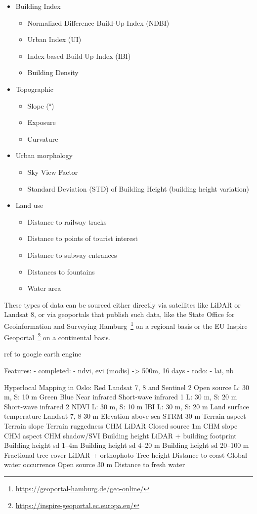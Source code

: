 \begin{itemize}
    \item Building Index
    \begin{itemize}
        \item Normalized Difference Build-Up Index (NDBI)
        \item Urban Index (UI)
        \item Index-based Build-Up Index (IBI)
        \item Building Density
    \end{itemize}
    \item Topographic
    \begin{itemize}
        \item Slope (°)
        \item Exposure
        \item Curvature
    \end{itemize}
    \item Urban morphology
    \begin{itemize}
        \item Sky View Factor
        \item Standard Deviation (STD) of Building Height (building height variation)
    \end{itemize}
    \item Land use
    \begin{itemize}
        \item Distance to railway tracks
        \item Distance to points of tourist interest
        \item Distance to subway entrances
        \item Distances to fountains
        \item Water area
    \end{itemize}
\end{itemize}

These types of data can be sourced either directly via satellites like LiDAR or Landsat 8, or via geoportals that publish such data, like the State Office for Geoinformation and Surveying Hamburg~\footnote{\url{https://geoportal-hamburg.de/geo-online/}} on a regional basis or the EU Inspire Geoportal~\footnote{\url{https://inspire-geoportal.ec.europa.eu/}} on a continental basis.

ref to google earth engine~\cite{gorelick2017google}

Features:
- completed:
    - ndvi, evi (modis) -> 500m, 16 days
- todo:
    - lai, nb


Hyperlocal Mapping in Oslo:
Red Landsat 7, 8 and Sentinel 2 Open source L: 30 m, S: 10 m Green Blue Near infrared Short-wave infrared 1 L: 30 m, S: 20 m Short-wave infrared 2 NDVI L: 30 m, S: 10 m IBI L: 30 m, S: 20 m Land surface temperature Landsat 7, 8 30 m Elevation above sea STRM 30 m Terrain aspect Terrain slope Terrain ruggedness CHM LiDAR Closed source 1m CHM slope CHM aspect CHM shadow/SVI Building height LiDAR + building footprint Building height sd 1–4m Building height sd 4–20 m Building height sd 20–100 m Fractional tree cover LiDAR + orthophoto Tree height Distance to coast Global water occurrence Open source 30 m Distance to fresh water